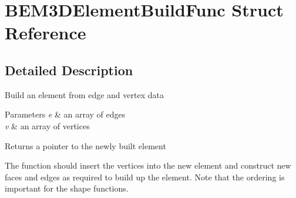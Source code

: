 \section{B\+E\+M3\+D\+Element\+Build\+Func Struct Reference}
\label{structBEM3DElementBuildFunc}


\subsection{Detailed Description}
Build an element from edge and vertex data


\begin{DoxyParams}{Parameters}
{\em e} & an array of edges \\
\hline
{\em v} & an array of vertices\\
\hline
\end{DoxyParams}
\begin{DoxyReturn}{Returns}
a pointer to the newly built element
\end{DoxyReturn}
The function should insert the vertices into the new element and construct new faces and edges as required to build up the element. Note that the ordering is important for the shape functions. 